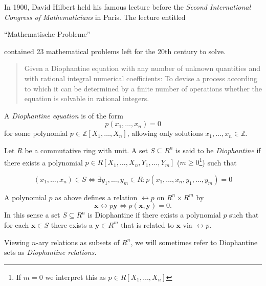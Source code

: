 
In 1900, David Hilbert held his famous lecture before the \emph{Second International Congress of Mathematicians} in Paris.
The lecture entitled \begin{german}\enquote{Mathematische Probleme}\end{german} contained 23 mathematical problems left for the 20th century to solve.


\begin{quotation}
    Given a Diophantine equation with any number of unknown quantities and with rational integral numerical coefficients: To devise a process according to which it can be determined by a finite number of operations whether the equation is solvable in rational integers.
\end{quotation}

A \emph{Diophantine equation} is of the form
%
\[ p(x_1, …, x_n) = 0 \]
%
for some polynomial $p ∈ ℤ[X_1, …, X_n]$, allowing only solutions $x_1,…,x_n ∈ ℤ$.


\begin{defin}
    Let $R$ be a commutative ring with unit.
    A set $S \subseteq R^n$ is said to be \emph{Diophantine} if there exists a polynomial $p ∈ R[X_1,…,X_n, Y_1,…,Y_m]$ ($m ≥ 0$\footnote{If $m = 0$ we interpret this as $p ∈ R[X_1,…,X_n]$}) such that

    \[ (x_1,…,x_n) ∈ S \Leftrightarrow ∃y_1,…,y_m ∈ R: p(x_1,…,x_n,y_1,…,y_m) = 0 \]
\end{defin}

A polynomial $p$ as above defines a relation $\rel{p}$ on $R^n \times R^m$ by
%
\[ \mathbf{x} \rel{p} \mathbf{y} \Leftrightarrow
   p(\mathbf{x}, \mathbf{y}) = 0. \]
%
In this sense a set $S \subseteq R^n$ is Diophantine if there exists a polynomial $p$ such that for each $\mathbf x ∈ S$ there exists a $\mathbf y ∈ R^m$ that is related to $\mathbf x$ via $\rel p$.

Viewing $n$-ary relations as subsets of $R^n$, we will sometimes refer to Diophantine sets as \emph{Diophantine relations.}

